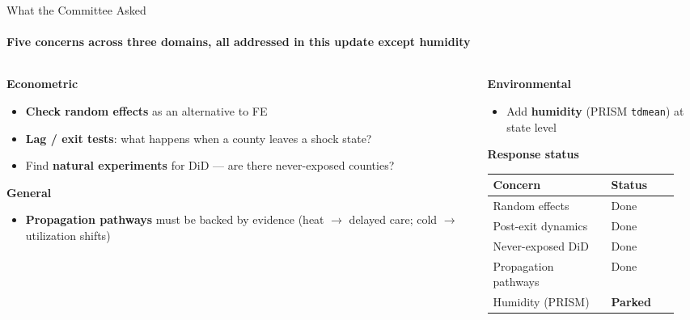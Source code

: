 \documentclass[aspectratio=169,11pt]{beamer}
\newcommand{\emphcolor}[1]{{\color{WarmOrange}\textbf{#1}}}
\newcommand{\tealtext}[1]{{\color{Teal}#1}}
\begin{document}
\begin{frame}{What the Committee Asked}
  \framesubtitle{Five concerns across three domains, all addressed in this update except humidity}
  \begin{columns}[T]
    \begin{column}{0.47\textwidth}
      \textbf{\tealtext{Econometric}}
      \begin{itemize}\itemsep0.15em
        \item \emphcolor{Check random effects} as an alternative to FE
        \item \emphcolor{Lag / exit tests}: what happens when a county leaves a shock state?
        \item Find \emphcolor{natural experiments} for DiD --- are there never-exposed counties?
      \end{itemize}
      \vspace{0.4em}
      \textbf{\tealtext{General}}
      \begin{itemize}\itemsep0.15em
        \item \emphcolor{Propagation pathways} must be backed by evidence (heat \(\to\) delayed care; cold \(\to\) utilization shifts)
      \end{itemize}
    \end{column}
    \begin{column}{0.47\textwidth}
      \textbf{\tealtext{Environmental}}
      \begin{itemize}\itemsep0.15em
        \item Add \emphcolor{humidity} (PRISM \texttt{tdmean}) at state level
      \end{itemize}
      \vspace{0.5em}
      \textbf{\tealtext{Response status}}\\[0.2em]
      \footnotesize
      \begin{tabular}{@{}>{\raggedright\arraybackslash}p{0.55\linewidth}>{\raggedright\arraybackslash}p{0.32\linewidth}@{}}
        \toprule
        Concern & Status \\
        \midrule
        Random effects & Done \\
        Post-exit dynamics & Done \\
        Never-exposed DiD & Done \\
        Propagation pathways & Done \\
        Humidity (PRISM) & \emphcolor{Parked} \\
        \bottomrule
      \end{tabular}
    \end{column}
  \end{columns}
\end{frame}
\end{document}
